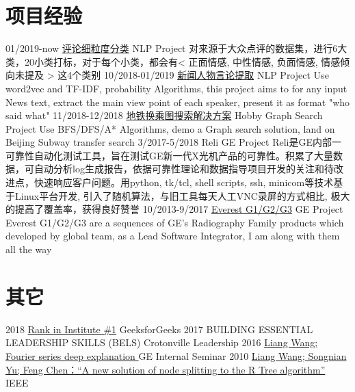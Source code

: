 \documentclass[letterpaper,10pt]{Resume_Liang}
\begin{document}
\begin{body}
\section{项目经验}
\begin{entrylist}
 \projectentry
  {01/2019-now}
  {\href{https://github.com/Artificial-Intelligence-for-NLP-and-CV/comment-setimental-classification}{评论细粒度分类}}
  {NLP Project}
  {对来源于大众点评的数据集，进行6大类，20小类打标，对于每个小类，都会有< 正面情感, 中性情感, 负面情感, 情感倾向未提及 > 这4个类别}
  \projectentry
    {10/2018-01/2019}
    {\href{https://github.com/wangliangster/TestWL/blob/master/ViewPointExtract.ipynb}{新闻人物言论提取}}
    {NLP Project}
    {Use word2vec and TF-IDF, probability Algorithms, this project aims to for any input News text, extract the main view point of each speaker, present it as format "who said what" }
  \projectentry
    {11/2018-12/2018}
    {\href{https://github.com/wangliangster/NLP-Course/blob/master/BeijingSubway.ipynb}{地铁换乘图搜索解决方案}}
    {Hobby Graph Search Project}
    {Use BFS/DFS/A* Algorithms, demo a Graph search solution, land on Beijing Subway transfer search}
    \projectentry
    {3/2017-5/2018}
    {Reli}
    {GE Project}
    {Reli是GE内部一可靠性自动化测试工具，旨在测试GE新一代X光机产品的可靠性。积累了大量数据，可自动分析log生成报告，依据可靠性理论和数据指导项目开发的关注和待改进点，快速响应客户问题。用python, tk/tcl, shell scripts, ssh, minicom等技术基于Linux平台开发, 引入了随机算法，与旧工具每天人工VNC录屏的方式相比, 极大的提高了覆盖率，获得良好赞誉}
     \projectentry
    {10/2013-9/2017}
    {\href{https://www.gehealthcare.com/en/products/radiography/fixed-rad-systems}{Everest G1/G2/G3}}
    {GE Project}
    {Everest G1/G2/G3 are a sequences of GE's Radiography Family products which developed by global team, as a Lead Software Integrator, I am along with them all the way  }
\end{entrylist}

\section{其它}
\begin{entrylist}
   \otherentry
   {2018}
   {\href{https://auth.geeksforgeeks.org/user/\%E7\%8E\%8B\%E8\%89\%AF/practice/}{Rank in Institute \#1}}
   {GeeksforGeeks}
    \otherentry
    {2017}
    {BUILDING ESSENTIAL LEADERSHIP SKILLS (BELS) }
    {Crotonville Leadership}
     \otherentry
    {2016}
    {\href{https://github.com/wangliangster/TestWL/blob/master/Fouries\%20Transfer\%20Notes3.pdf}{Liang Wang; Fourier series deep explanation }}
    {GE Internal Seminar }
    \otherentry
    {2010}
    {\href{https://ieeexplore.ieee.org/document/5564214}{Liang Wang; Songnian Yu; Feng Chen：“A new solution of node splitting to the R Tree algorithm”}}
    {IEEE}
\end{entrylist}
\end{body}
\end{document}
